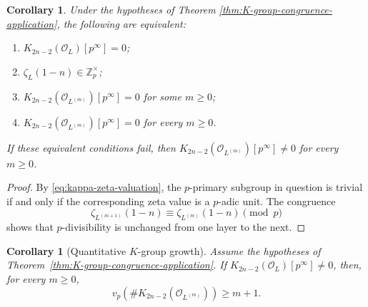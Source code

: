 \documentclass[11pt,table]{amsart}
\newtheorem{corollary}[theorem]{Corollary}
\numberwithin{equation}{section}
\begin{document}
\begin{corollary}
\label{cor:K-group-p-torsion-dichotomy}
Under the hypotheses of Theorem
\ref{thm:K-group-congruence-application}, the following are
equivalent:
\begin{enumerate}
\item \(K_{2n-2}(\mathcal O_L)[p^\infty]=0\);
\item \(\zeta_L(1-n)\in\mathbb Z_p^\times\);
\item \(K_{2n-2}(\mathcal O_{L^{(m)}})[p^\infty]=0\) for some
\(m\geq 0\);
\item \(K_{2n-2}(\mathcal O_{L^{(m)}})[p^\infty]=0\) for every
\(m\geq 0\).
\end{enumerate}
If these equivalent conditions fail, then
\(K_{2n-2}(\mathcal O_{L^{(m)}})[p^\infty]\neq 0\) for every
\(m\geq 0\).
\end{corollary}

\begin{proof}
By \eqref{eq:kappa-zeta-valuation}, the \(p\)-primary subgroup in
question is trivial if and only if the corresponding zeta value is a
\(p\)-adic unit. The congruence
\[
        \zeta_{L^{(m+1)}}(1-n)
        \equiv
        \zeta_{L^{(m)}}(1-n)
        \pmod p
\]
shows that \(p\)-divisibility is unchanged from one layer to the next.
\end{proof}

\begin{corollary}[Quantitative \(K\)-group growth]
\label{cor:K-growth}
Assume the hypotheses of
Theorem~\ref{thm:K-group-congruence-application}. If $K_{2n-2}(\mathcal O_L)[p^\infty]\neq0$,
then, for every \(m\geq0\),
\[
        v_p\!\left(
        \#K_{2n-2}(\mathcal O_{L^{(m)}})
        \right)
        \geq m+1.
\]
\end{corollary}
\end{document}
